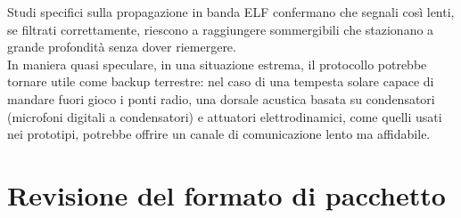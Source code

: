  Studi specifici sulla propagazione in banda ELF confermano che segnali così lenti, se filtrati correttamente,
  riescono a raggiungere sommergibili che stazionano a grande profondità senza dover riemergere. \\

  In maniera quasi speculare, in una situazione estrema, il protocollo potrebbe tornare utile come backup terrestre: nel caso di una tempesta solare capace di
   mandare fuori gioco i ponti radio, una dorsale acustica basata su condensatori (microfoni digitali a condensatori) e attuatori elettrodinamici, come 
    quelli usati nei prototipi,
    potrebbe offrire un canale di comunicazione lento ma affidabile.\\

\section{Revisione del formato di pacchetto}
\label{sec:pacchetti_future}


